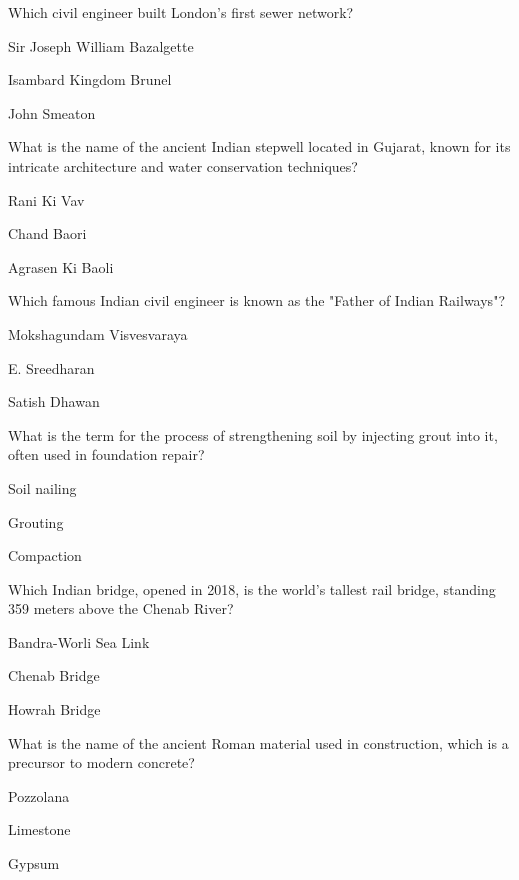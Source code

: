 
\begin{enhancedmcq}{Which civil engineer built London's first sewer network?}
\item Sir Joseph William Bazalgette
\item Isambard Kingdom Brunel
\item John Smeaton

\end{enhancedmcq}
\begin{enhancedmcq}{What is the name of the ancient Indian stepwell located in Gujarat, known for its intricate architecture and water conservation techniques?}
\item Rani Ki Vav
\item Chand Baori
\item Agrasen Ki Baoli

\end{enhancedmcq}
\begin{enhancedmcq}{Which famous Indian civil engineer is known as the "Father of Indian Railways"?}
\item Mokshagundam Visvesvaraya
\item E. Sreedharan
\item Satish Dhawan

\end{enhancedmcq}
\begin{enhancedmcq}{What is the term for the process of strengthening soil by injecting grout into it, often used in foundation repair?}
\item Soil nailing
\item Grouting
\item Compaction

\end{enhancedmcq}
\begin{enhancedmcq}{Which Indian bridge, opened in 2018, is the world's tallest rail bridge, standing 359 meters above the Chenab River?}
\item Bandra-Worli Sea Link
\item Chenab Bridge
\item Howrah Bridge

\end{enhancedmcq}
\begin{enhancedmcq}{What is the name of the ancient Roman material used in construction, which is a precursor to modern concrete?}
\item Pozzolana
\item Limestone
\item Gypsum

\end{enhancedmcq}
